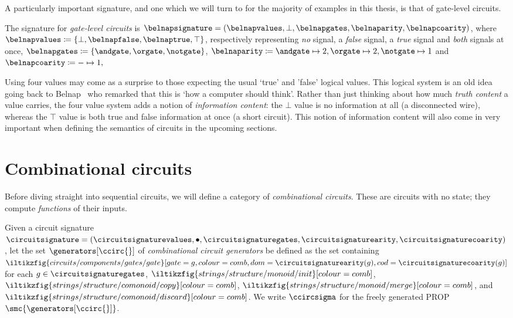 A particularly important signature, and one which we will turn to for the
majority of examples in this thesis, is that of gate-level circuits.

\begin{example}\label{ex:sig}
    The signature for \emph{gate-level circuits} is \(
    \belnapsignature = (
    \belnapvalues,
    \bot,
    \belnapgates,
    \belnaparity,
    \belnapcoarity
    )\), where \(
    \belnapvalues \coloneqq \{\bot, \belnapfalse, \belnaptrue, \top\}
    \), respectively representing \emph{no} signal, a \emph{false} signal, a
    \emph{true} signal and \emph{both} signals at once, \(
    \belnapgates \coloneqq \{\andgate,\orgate,\notgate\}
    \), \(
    \belnaparity \coloneqq
    \andgate \mapsto 2,
    \orgate \mapsto 2,
    \notgate \mapsto 1
    \) and \(
    \belnapcoarity \coloneqq - \mapsto 1,
    \)
\end{example}

\begin{remark}
    Using four values may come as a surprise to those expecting the usual
    `true' and 'false' logical values.
    This logical system is an old idea going back to
    Belnap~\cite{belnap1977useful} who remarked that this is `how a computer
    should think'.
    Rather than just thinking about how much \emph{truth content} a value
    carries, the four value system adds a notion of \emph{information content}:
    the \(\bot\) value is no information at all (a disconnected wire), whereas
    the \(\top\) value is both true and false information at once
    (a short circuit).
    This notion of information content will also come in very important when
    defining the semantics of circuits in the upcoming sections.
\end{remark}

\section{Combinational circuits}

Before diving straight into sequential circuits, we will define a category of
\emph{combinational circuits}.
These are circuits with no state; they compute \emph{functions} of their inputs.

\begin{definition}
    Given a circuit signature \(
    \circuitsignature = (
    \circuitsignaturevalues,
    \bullet,
    \circuitsignaturegates,
    \circuitsignaturearity,
    \circuitsignaturecoarity
    )
    \), let the set \(\generators[\ccirc{}]\) of
    \emph{combinational circuit generators} be defined as the set containing \(
    \iltikzfig{circuits/components/gates/gate}[gate=g,colour=comb,dom=\circuitsignaturearity(g),cod=\circuitsignaturecoarity(g)]
    \) for each \(g \in \circuitsignaturegates\),
    \(\iltikzfig{strings/structure/monoid/init}[colour=comb]\),
    \(\iltikzfig{strings/structure/comonoid/copy}[colour=comb]\),
    \(\iltikzfig{strings/structure/monoid/merge}[colour=comb]\), and
    \(\iltikzfig{strings/structure/comonoid/discard}[colour=comb]\).
    We write \(\ccircsigma\) for the freely generated PROP
    \(\smc{\generators[\ccirc{}]}\).
\end{definition}


